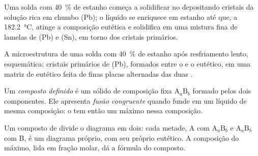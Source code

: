 Uma solda com 40~\% de estanho começa a solidificar no  depositando
cristais da solução rica em chumbo (Pb); o líquido se enriquece em estanho
até que, a \qty{182.2}{\degreeCelsius}, atinge a composição eutética e
solidifica em uma mistura fina de lamelas de (Pb) e (Sn), em torno dos
cristais primários.

\begin{omfigure}

{\small A microestrutura de uma solda com 40~\% de estanho após resfriamento
lento, esquemática: cristais primários de (Pb), formados entre o  e o
eutético, em uma matriz de eutético feita de finas placas alternadas das
duas .}
\end{omfigure}

\begin{definition}\label{def:b2:solid-liquid-diagrams:defined-compound}
Um \emph{composto definido} é um sólido de composição
fixa $\mathrm{A}_a\mathrm{B}_b$ formado pelos dois componentes. Ele apresenta
\emph{fusão congruente} quando funde em um
líquido de mesma composição: o  tem então um máximo nessa composição.
\end{definition}

Um composto de  divide o diagrama em dois: cada metade, A com
$\mathrm{A}_a\mathrm{B}_b$ e $\mathrm{A}_a\mathrm{B}_b$ com B, é um diagrama
próprio, com seu próprio eutético. A composição do máximo, lida em fração
molar, dá a fórmula do composto.

